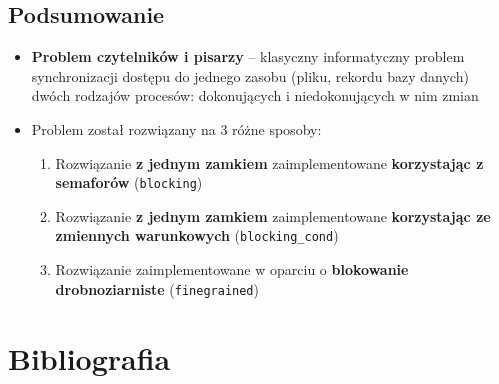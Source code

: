 \documentclass[11pt]{article}
\providecommand{\tightlist}{%
      \setlength{\itemsep}{0pt}\setlength{\parskip}{0pt}}
\begin{document}
    \hypertarget{podsumowanie}{%
\subsection{Podsumowanie}\label{podsumowanie}}

\begin{itemize}
\tightlist
\item
  \textbf{Problem czytelników i pisarzy} -- klasyczny informatyczny
  problem synchronizacji dostępu do jednego zasobu (pliku, rekordu bazy
  danych) dwóch rodzajów procesów: dokonujących i niedokonujących w nim
  zmian
\item
  Problem został rozwiązany na 3 różne sposoby:

  \begin{enumerate}
  \def\labelenumi{\arabic{enumi}.}
  \tightlist
  \item
    Rozwiązanie \textbf{z jednym zamkiem} zaimplementowane
    \textbf{korzystając z semaforów} (\texttt{blocking})
  \item
    Rozwiązanie \textbf{z jednym zamkiem} zaimplementowane
    \textbf{korzystając ze zmiennych warunkowych}
    (\texttt{blocking\_cond})
  \item
    Rozwiązanie zaimplementowane w oparciu o \textbf{blokowanie
    drobnoziarniste} (\texttt{finegrained})
  \end{enumerate}
\end{itemize}

    \hypertarget{bibliografia}{%
\section{Bibliografia}\label{bibliografia}}
\end{document}
